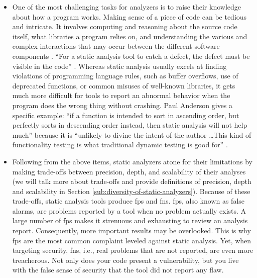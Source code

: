 \begin{itemize}
    \item[\textcolor{custom-red}{\ding{55}}] One of the most challenging tasks for analyzers is to raise their knowledge about how a program works. Making sense of a piece of code can be tedious and intricate. It involves computing and reasoning about the source code itself, what libraries a program relies on, and understanding the various and complex interactions that may occur between the different software components \cite{anderson2008use,black2009static}. ``For a static analysis tool to catch a defect, the defect must be visible in the code'' \cite{chess2007secure}. Whereas static analysis usually excels at finding violations of programming language rules, such as buffer overflows, use of deprecated functions, or common misuses of well-known libraries, it gets much more difficult for tools to report an abnormal behavior when the program does the wrong thing without crashing. Paul Anderson gives a specific example: ``if a function is intended to sort in ascending order, but perfectly sorts in descending order instead, then static analysis will not help much'' because it is ``unlikely to divine the intent of the author \dots This kind of functionality testing is what traditional dynamic testing is good for'' \cite{anderson2008use}.
    \item[\textcolor{custom-red}{\ding{55}}] Following from the above items, static analyzers atone for their limitations by making trade-offs between precision, depth, and scalability of their analyses (we will talk more about trade-offs and provide definitions of precision, depth and scalability in Section \ref{sub:diversity-of-static-analyzers}). Because of these trade-offs, static analysis tools produce \glspl{fp} and \glspl{fn}. \Glspl{fp}, also known as false alarms, are problems reported by a tool when no problem actually exists. A large number of \glspl{fp} makes it strenuous and exhausting to review an analysis report. Consequently, more important results may be overlooked. This is why \glspl{fp} are the most common complaint leveled against static analysis. Yet, when targeting security, \glspl{fn}, i.e., real problems that are not reported, are even more treacherous. Not only does your code present a vulnerability, but you live with the false sense of security that the tool did not report any flaw.
\end{itemize}

